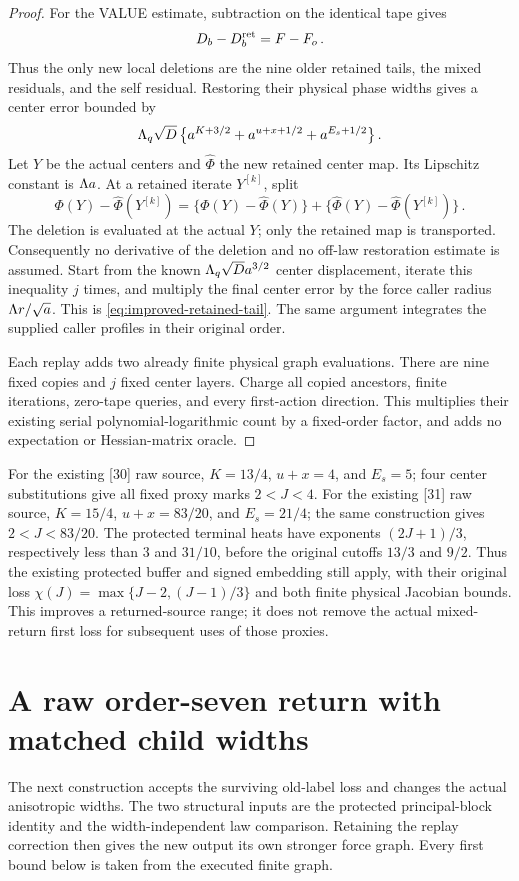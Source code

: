 \documentclass[11pt]{article}
\numberwithin{equation}{section}
\theoremstyle{remark}\newtheorem{remark}[theorem]{Remark}
\begin{document}
\begin{proof}
For the VALUE estimate, subtraction on the identical tape gives
\[
 D_b-D_b^{\rm ret}=F-F_o\,.
\]
Thus the only new local deletions are the nine older retained tails,
the mixed residuals, and the self residual. Restoring their physical
phase widths gives a center error bounded by
\[
 \Lambda_q\sqrt D\,
 \bigl\{a^{K+3/2}+a^{u+x+1/2}+a^{E_s+1/2}\bigr\}\,.
\]
Let $Y$ be the actual centers and $\widehat\Phi$ the new retained
center map. Its Lipschitz constant is $\Lambda a$. At a retained
iterate $Y^{[k]}$, split
\[
 \Phi(Y)-\widehat\Phi(Y^{[k]})
 =\bigl\{\Phi(Y)-\widehat\Phi(Y)\bigr\}
   +\bigl\{\widehat\Phi(Y)-\widehat\Phi(Y^{[k]})\bigr\}\,.
\]
The deletion is evaluated at the actual $Y$; only the retained map
is transported. Consequently no derivative of the deletion and no
off-law restoration estimate is assumed. Start from the known
$\Lambda_q\sqrt D a^{3/2}$ center displacement, iterate this inequality
$j$ times, and multiply the final center error by the force caller
radius $\Lambda r/\sqrt a$. This is
\eqref{eq:improved-retained-tail}. The same argument integrates the
supplied caller profiles in their original order.

Each replay adds two already finite physical graph evaluations.
There are nine fixed copies and $j$ fixed center layers. Charge all
copied ancestors, finite iterations, zero-tape queries, and every
first-action direction. This multiplies their existing serial
polynomial-logarithmic count by a fixed-order factor, and adds no
expectation or Hessian-matrix oracle.
\end{proof}

For the existing [30] raw source, $K=13/4$, $u+x=4$, and $E_s=5$;
four center substitutions give all fixed proxy marks $2<J<4$.
For the existing [31] raw source, $K=15/4$, $u+x=83/20$, and
$E_s=21/4$; the same construction gives $2<J<83/20$.
The protected terminal heats have exponents $(2J+1)/3$, respectively
less than $3$ and $31/10$, before the original cutoffs $13/3$ and
$9/2$. Thus the existing protected buffer and signed embedding still
apply, with their original loss
$\chi(J)=\max\{J-2,(J-1)/3\}$ and both finite physical Jacobian bounds.
This improves a returned-source range; it does not remove the actual
mixed-return first loss for subsequent uses of those proxies.


\section{A raw order-seven return with matched child widths}
\label{sec:raw-seven}
The next construction accepts the surviving old-label loss and changes
the actual anisotropic widths. The two structural inputs are the
protected principal-block identity and the width-independent law
comparison. Retaining the replay correction then gives the new output
its own stronger force graph. Every first bound below is taken from the executed finite graph.
\end{document}
